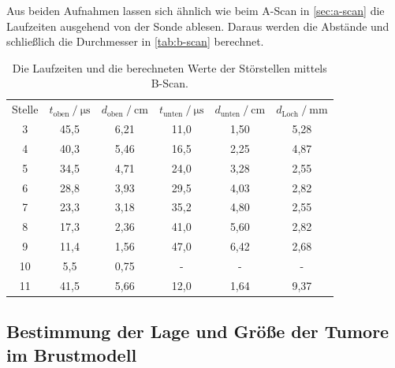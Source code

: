 Aus beiden Aufnahmen lassen sich ähnlich wie beim A-Scan in \autoref{sec:a-scan} die Laufzeiten ausgehend von der Sonde ablesen.
Daraus werden die Abstände und schließlich die Durchmesser in \autoref{tab:b-scan} berechnet.
\begin{table}[H]
  \centering
  \caption{Die Laufzeiten und die berechneten Werte der Störstellen mittels B-Scan.}
  \label{tab:b-scan}
  \begin{tabular}{c c c c c c}
    \toprule
    \multicolumn{1}{c}{Stelle} &
    \multicolumn{1}{c}{$t_\text{oben} \mathbin{/} \unit{\micro\second}$} &
    \multicolumn{1}{c}{$d_\text{oben} \mathbin{/} \unit{\centi\meter}$} &
    \multicolumn{1}{c}{$t_\text{unten} \mathbin{/} \unit{\micro\second}$} &
    \multicolumn{1}{c}{$d_\text{unten} \mathbin{/} \unit{\centi\meter}$} &
    \multicolumn{1}{c}{$d_\text{Loch} \mathbin{/} \unit{\milli\meter}$ } \\

    \cmidrule(lr){1-1} \cmidrule(lr){2-3} \cmidrule(lr){4-5} \cmidrule(lr){6-6} 
    
      3 &    45,5 &    6,21 &     11,0 &     1,50 &    5,28 \\
      4 &    40,3 &    5,46 &     16,5 &     2,25 &    4,87 \\
      5 &    34,5 &    4,71 &     24,0 &     3,28 &    2,55 \\
      6 &    28,8 &    3,93 &     29,5 &     4,03 &    2,82 \\
      7 &    23,3 &    3,18 &     35,2 &     4,80 &    2,55 \\
      8 &    17,3 &    2,36 &     41,0 &     5,60 &    2,82 \\
      9 &    11,4 &    1,56 &     47,0 &     6,42 &    2,68 \\
     10 &     5,5 &    0,75 &        - &        - &       - \\
     11 &    41,5 &    5,66 &     12,0 &     1,64 &    9,37 \\
    \bottomrule
  \end{tabular}
\end{table}


\subsection{Bestimmung der Lage und Größe der Tumore im Brustmodell}

